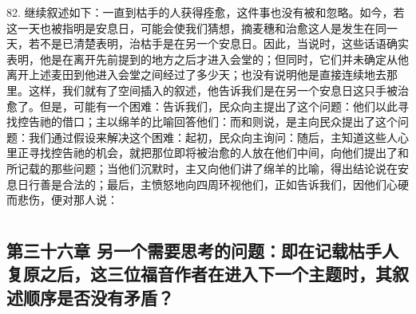 82. 继续叙述如下：一直到枯手的人获得痊愈，这件事也没有被和忽略。如今，若这一天也被指明是安息日，可能会使我们猜想，摘麦穗和治愈这人是发生在同一天，若不是已清楚表明，治枯手是在另一个安息日。因此，当说时，这些话语确实表明，他是在离开先前提到的地方之后才进入会堂的；但同时，它们并未确定从他离开上述麦田到他进入会堂之间经过了多少天；也没有说明他是直接连续地去那里。这样，我们就有了空间插入的叙述，他告诉我们是在另一个安息日这只手被治愈了。但是，可能有一个困难：告诉我们，民众向主提出了这个问题：他们以此寻找控告祂的借口；主以绵羊的比喻回答他们：而和则说，是主向民众提出了这个问题：我们通过假设来解决这个困难：起初，民众向主询问：随后，主知道这些人心里正寻找控告祂的机会，就把那位即将被治愈的人放在他们中间，向他们提出了和所记载的那些问题；当他们沉默时，主又向他们讲了绵羊的比喻，得出结论说在安息日行善是合法的；最后，主愤怒地向四周环视他们，正如告诉我们，因他们心硬而悲伤，便对那人说：\par



\section{}


\subsection{第三十六章 另一个需要思考的问题：即在记载枯手人复原之后，这三位福音作者在进入下一个主题时，其叙述顺序是否没有矛盾？}

